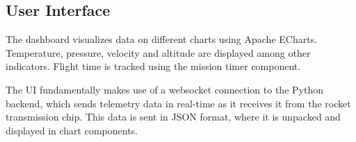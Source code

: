 \subsectionfont{\fontsize{14}{14}\selectfont}
\subsection{User Interface}

 The dashboard visualizes data on different charts using Apache ECharts. Temperature, pressure, velocity and altitude are displayed among other indicators. Flight time is tracked using the mission timer component.

The UI fundamentally makes use of a websocket connection to the Python backend, which sends telemetry data in real-time as it receives it from the rocket transmission chip. This data is sent in JSON format, where it is unpacked and displayed in chart components.
